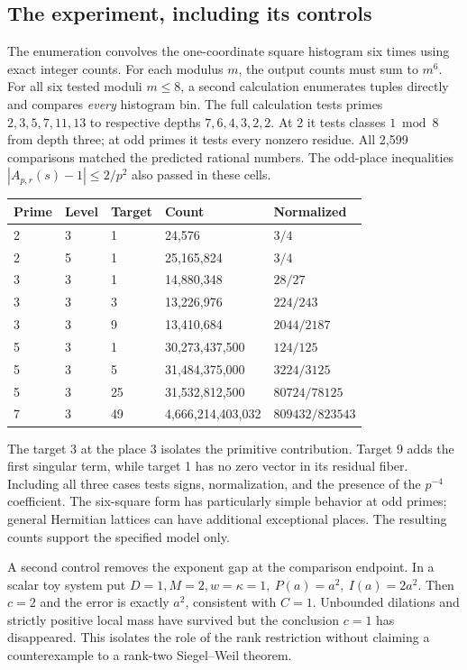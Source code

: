 \documentclass[12pt,letterpaper]{article}
\begin{document}
\clearpage\subsection{The experiment, including its controls}
The enumeration convolves the one-coordinate square histogram six times using exact integer counts. For each modulus \(m\), the output counts must sum to \(m^6\). For all six tested moduli \(m\le8\), a second calculation enumerates tuples directly and compares \emph{every} histogram bin. The full calculation tests primes \(2,3,5,7,11,13\) to respective depths \(7,6,4,3,2,2\). At 2 it tests classes \(1\bmod8\) from depth three; at odd primes it tests every nonzero residue. All 2,599 comparisons matched the predicted rational numbers. The odd-place inequalities \(|A_{p,r}(s)-1|\le2/p^2\) also passed in these cells.
\begin{center}\small\begin{tabular}{lllll}\toprule Prime & Level & Target & Count & Normalized\\\midrule 
2 & 3 & 1 & 24,576 & $3/4$\\
2 & 5 & 1 & 25,165,824 & $3/4$\\
3 & 3 & 1 & 14,880,348 & $28/27$\\
3 & 3 & 3 & 13,226,976 & $224/243$\\
3 & 3 & 9 & 13,410,684 & $2044/2187$\\
5 & 3 & 1 & 30,273,437,500 & $124/125$\\
5 & 3 & 5 & 31,484,375,000 & $3224/3125$\\
5 & 3 & 25 & 31,532,812,500 & $80724/78125$\\
7 & 3 & 49 & 4,666,214,403,032 & $809432/823543$\\\bottomrule\end{tabular}\end{center}
The target 3 at the place 3 isolates the primitive contribution. Target 9 adds the first singular term, while target 1 has no zero vector in its residual fiber. Including all three cases tests signs, normalization, and the presence of the \(p^{-4}\) coefficient. The six-square form has particularly simple behavior at odd primes; general Hermitian lattices can have additional exceptional places. The resulting counts support the specified model only.

A second control removes the exponent gap at the comparison endpoint. In a scalar toy system put \(D=1,M=2,w=\kappa=1,\ P(a)=a^2,\ I(a)=2a^2\). Then \(c=2\) and the error is exactly \(a^2\), consistent with \(C=1\). Unbounded dilations and strictly positive local mass have survived but the conclusion \(c=1\) has disappeared. This isolates the role of the rank restriction without claiming a counterexample to a rank-two Siegel--Weil theorem.
\end{document}
